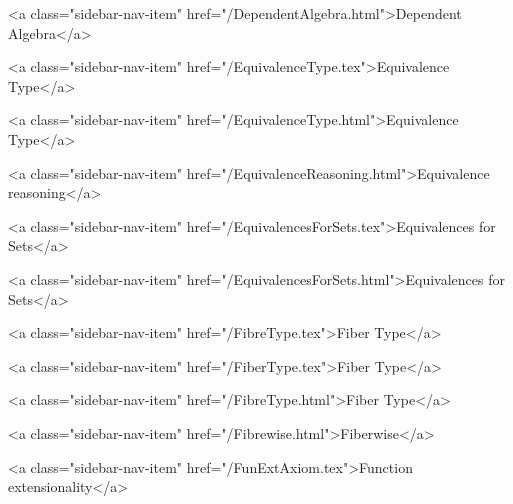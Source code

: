       
        
          <a class="sidebar-nav-item" href="/DependentAlgebra.html">Dependent Algebra</a>
        
      
    
      
        
          <a class="sidebar-nav-item" href="/EquivalenceType.tex">Equivalence Type</a>
        
      
    
      
        
          <a class="sidebar-nav-item" href="/EquivalenceType.html">Equivalence Type</a>
        
      
    
      
        
          <a class="sidebar-nav-item" href="/EquivalenceReasoning.html">Equivalence reasoning</a>
        
      
    
      
        
          <a class="sidebar-nav-item" href="/EquivalencesForSets.tex">Equivalences for Sets</a>
        
      
    
      
        
          <a class="sidebar-nav-item" href="/EquivalencesForSets.html">Equivalences for Sets</a>
        
      
    
      
        
          <a class="sidebar-nav-item" href="/FibreType.tex">Fiber Type</a>
        
      
    
      
        
          <a class="sidebar-nav-item" href="/FiberType.tex">Fiber Type</a>
        
      
    
      
        
          <a class="sidebar-nav-item" href="/FibreType.html">Fiber Type</a>
        
      
    
      
        
          <a class="sidebar-nav-item" href="/Fibrewise.html">Fiberwise</a>
        
      
    
      
        
          <a class="sidebar-nav-item" href="/FunExtAxiom.tex">Function extensionality</a>
        
